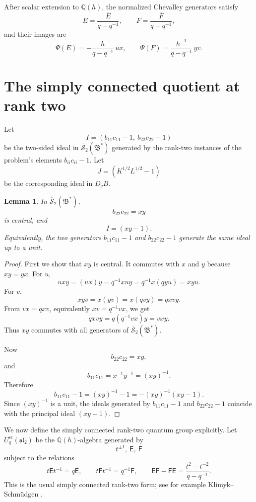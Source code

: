 \documentclass[12pt]{article}
\theoremstyle{plain}
\newtheorem{lemma}[theorem]{Lemma}
\theoremstyle{definition}
\numberwithin{equation}{section}
\newcommand{\Field}{\mathbb{Q}(h)}
\newcommand{\bigon}{\mathfrak{B}^{*}}
\newcommand{\hS}{\overline{\mathscr{S}}}
\newcommand{\DqB}{D_qB}
\newcommand{\Khalf}{K^{1/2}}
\newcommand{\Lhalf}{L^{1/2}}
\newcommand{\Ebar}{\overline{E}}
\newcommand{\Fbar}{\overline{F}}
\newcommand{\Uqsc}{U_q^{\mathrm{sc}}(\mathfrak{sl}_2)}
\begin{document}
After scalar extension to \(\Field\), the normalized Chevalley generators satisfy
\[
E=\frac{\Ebar}{q-q^{-1}},
\qquad
F=\frac{\Fbar}{q-q^{-1}},
\]
and their images are
\[
\Psi(E)= -\frac{h}{q-q^{-1}}\,u x,
\qquad
\Psi(F)= \frac{h^{-1}}{q-q^{-1}}\,y v.
\]

\section{The simply connected quotient at rank two}
\label{sec:quotient}

Let
\[
I=(b_{11}c_{11}-1,\ b_{22}c_{22}-1)
\]
be the two-sided ideal in \(\hS_2(\bigon)\) generated by the rank-two instances of the problem's elements \(b_{ii}c_{ii}-1\).  Let
\[
J=(\Khalf\Lhalf-1)
\]
be the corresponding ideal in \(\DqB\).

\begin{lemma}\label{lem:ideal-principal}
In \(\hS_2(\bigon)\),
\[
b_{22}c_{22}=xy
\]
is central, and
\[
I=(xy-1).
\]
Equivalently, the two generators \(b_{11}c_{11}-1\) and \(b_{22}c_{22}-1\) generate the same ideal up to a unit.
\end{lemma}

\begin{proof}
First we show that \(xy\) is central.  It commutes with \(x\) and \(y\) because \(xy=yx\).  For \(u\),
\[
u x y
=
(u x)y
=
q^{-1}x u y
=
q^{-1}x(q y u)
=
x y u.
\]
For \(v\),
\[
x y v
=
x(y v)
=
x(q v y)
=
q x v y.
\]
From \(v x=q x v\), equivalently \(x v=q^{-1}v x\), we get
\[
q x v y
=
q(q^{-1}v x)y
=
v x y.
\]
Thus \(xy\) commutes with all generators of \(\hS_2(\bigon)\).

Now
\[
b_{22}c_{22}=xy,
\]
and
\[
b_{11}c_{11}=x^{-1}y^{-1}=(xy)^{-1}.
\]
Therefore
\[
b_{11}c_{11}-1
=
(xy)^{-1}-1
=
-(xy)^{-1}(xy-1).
\]
Since \((xy)^{-1}\) is a unit, the ideals generated by \(b_{11}c_{11}-1\) and \(b_{22}c_{22}-1\) coincide with the principal ideal \((xy-1)\).
\end{proof}

We now define the simply connected rank-two quantum group explicitly.  Let \(\Uqsc\) be the \(\Field\)-algebra generated by
\[
t^{\pm1},\ \mathsf E,\ \mathsf F
\]
subject to the relations
\[
t\mathsf E t^{-1}=q\mathsf E,
\qquad
t\mathsf F t^{-1}=q^{-1}\mathsf F,
\qquad
\mathsf E\mathsf F-\mathsf F\mathsf E
=
\frac{t^2-t^{-2}}{q-q^{-1}}.
\]
This is the usual simply connected rank-two form; see for example Klimyk--Schmüdgen \cite{KlimykSchmudgen}.
\end{document}
